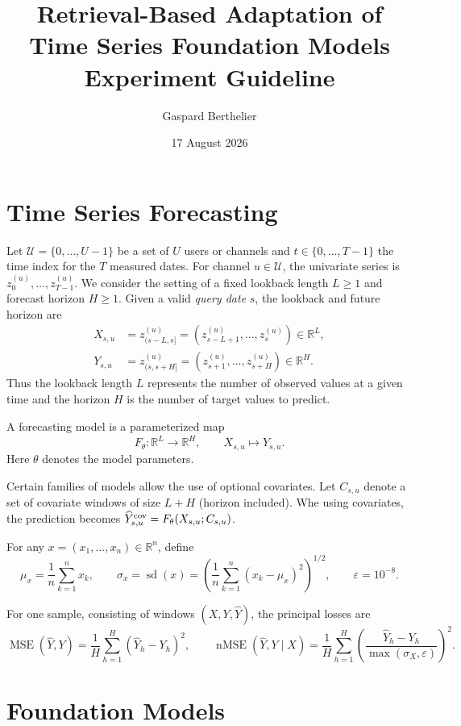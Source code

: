 \documentclass[10pt]{article}
\title{\vspace{-1.5em}\textbf{Retrieval-Based Adaptation of \\Time Series Foundation Models}\\[2mm]\large Experiment Guideline\vspace{-0.4em}}
\author{Gaspard Berthelier}
\date{17 August 2026}
\newcommand{\reals}{\mathbb{R}}
\newcommand{\sd}{\operatorname{sd}}
\newcommand{\MSE}{\operatorname{MSE}}
\newcommand{\nMSE}{\operatorname{nMSE}}
\begin{document}
\maketitle

\tableofcontents

\section{Time Series Forecasting}
\label{sec:forecasting}

Let $\mathcal U=\{0,\ldots,U-1\}$ be a set of $U$ users or channels and
$t\in\{0,\ldots,T-1\}$ the time index for the $T$ measured dates. For channel
$u\in\mathcal U$, the univariate series is
$z^{(u)}_0,\ldots,z^{(u)}_{T-1}$. We consider the setting of a fixed lookback length $L\geq1$ and forecast
horizon $H\geq1$. Given a valid \emph{query date} $s$, the lookback and future horizon are
\begin{align}
 X_{s,u}
 &= z^{(u)}_{(s-L,s]}
  = (z^{(u)}_{s-L+1},\ldots,z^{(u)}_s)\in\reals^L,\\
 Y_{s,u}
 &= z^{(u)}_{(s,s+H]}
  = (z^{(u)}_{s+1},\ldots,z^{(u)}_{s+H})\in\reals^H.
\end{align}
Thus the lookback length $L$ represents the number of observed values at a given time and the horizon $H$ is the number of target values to predict.

A forecasting model is a parameterized map
\[
 F_\theta:\reals^L\longrightarrow\reals^H,
 \qquad X_{s,u}\longmapsto \widehat Y_{s,u}.
\]
Here $\theta$ denotes the model parameters.

Certain families of models allow the use of optional covariates. Let $C_{s,u}$ denote a set of covariate windows of size $L+H$ (horizon included).
Whe using covariates, the prediction becomes $\widehat Y^{\rm cov}_{s,u}=F_\theta(X_{s,u};C_{s,u})$.

For any $x=(x_1,\ldots,x_n)\in\reals^n$, define
\[
 \mu_x=\frac1n\sum_{k=1}^n x_k,
 \qquad
 \sigma_x=\sd(x)=\left(\frac1n\sum_{k=1}^n(x_k-\mu_x)^2\right)^{1/2},
 \qquad \varepsilon=10^{-8}.
\]

For one sample, consisting of windows $(X,Y,\widehat Y)$, the principal losses are
\[
 \MSE(\widehat Y,Y)=\frac1H\sum_{h=1}^H(\widehat Y_h-Y_h)^2,
 \qquad
 \nMSE(\widehat Y,Y\mid X)
 =\frac1H\sum_{h=1}^H
 \left(\frac{\widehat Y_h-Y_h}{\max(\sigma_X,\varepsilon)}\right)^2.
\]

\section{Foundation Models}
\label{sec:foundation-models}
\end{document}
